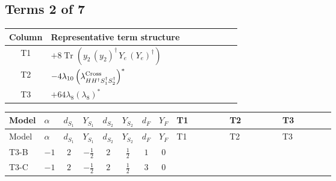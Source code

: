 \documentclass[8pt]{article}
\begin{document}
\begin{landscape}
\subsection*{Terms 2 of 7}
\begin{center}
\begin{tabular}{@{}c >{\raggedright\arraybackslash}p{0.82\linewidth}@{}}
\toprule
Column & Representative term structure \\
\midrule
T1 & \(\displaystyle +8 \operatorname{Tr}\!\left({y_2}\,\left({y_2}\right)^{\dagger}\,{Y_e}\,\left({Y_e}\right)^{\dagger}\right)\) \\
\midrule
T2 & \(\displaystyle -4 {\lambda_{10}} \left({\lambda_{H H^\dagger S_1^\dagger S_2^\dagger}^{\rm Cross}}\right)^{*}\) \\
\midrule
T3 & \(\displaystyle +64 {\lambda_{8}} \left({\lambda_{8}}\right)^{*}\) \\
\midrule
\bottomrule
\end{tabular}
\end{center}
\smallskip
\tiny
\begin{longtable}{@{}llcccccc >{\raggedright\arraybackslash}p{0.21\linewidth} >{\raggedright\arraybackslash}p{0.21\linewidth} >{\raggedright\arraybackslash}p{0.21\linewidth}@{}}
\toprule
Model & $\alpha$ & $d_{S_1}$ & $Y_{S_1}$ & $d_{S_2}$ & $Y_{S_2}$ & $d_F$ & $Y_F$ & T1 & T2 & T3 \\
\midrule
\endfirsthead
\toprule
Model & $\alpha$ & $d_{S_1}$ & $Y_{S_1}$ & $d_{S_2}$ & $Y_{S_2}$ & $d_F$ & $Y_F$ & T1 & T2 & T3 \\
\midrule
\endhead
T3-B & $-1$ & $2$ & $-\frac{1}{2}$ & $2$ & $\frac{1}{2}$ & $1$ & $0$ & \scriptsize\adjustbox{max width=\linewidth}{$\begin{gathered} +8 \operatorname{Tr}\!\left({y_2}\,\left({y_2}\right)^{\dagger}\,{Y_e}\,\left({Y_e}\right)^{\dagger}\right)\end{gathered}$} & \scriptsize\adjustbox{max width=\linewidth}{$\begin{gathered} -4 {\lambda_{10}} \left({\lambda_{H H^\dagger S_1^\dagger S_2^\dagger}^{\rm Cross}}\right)^{*}\end{gathered}$} & \scriptsize\adjustbox{max width=\linewidth}{$\begin{gathered} +64 {\lambda_{8}} \left({\lambda_{8}}\right)^{*}\end{gathered}$} \\
\midrule
T3-C & $-1$ & $2$ & $-\frac{1}{2}$ & $2$ & $\frac{1}{2}$ & $3$ & $0$ & \scriptsize\adjustbox{max width=\linewidth}{$\begin{gathered} -4 \operatorname{Tr}\!\left({y_2}\,\left({y_2}\right)^{\dagger}\,{Y_e}\,\left({Y_e}\right)^{\dagger}\right)\end{gathered}$} & \scriptsize\adjustbox{max width=\linewidth}{$\begin{gathered} -4 {\lambda_{10}} \left({\lambda_{H H^\dagger S_1^\dagger S_2^\dagger}^{\rm Cross}}\right)^{*}\end{gathered}$} & \scriptsize\adjustbox{max width=\linewidth}{$\begin{gathered} +64 {\lambda_{8}} \left({\lambda_{8}}\right)^{*}\end{gathered}$} \\

\end{longtable}
\end{landscape}
\end{document}
